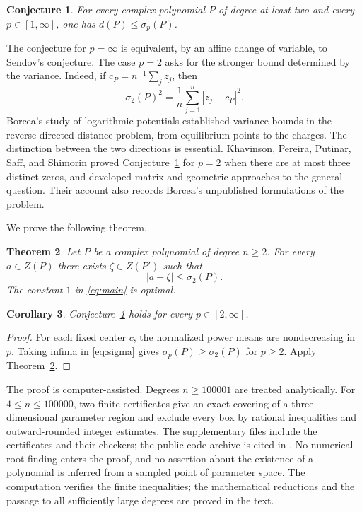 \documentclass[11pt,reqno]{amsart}
\newtheorem{thm}{Theorem}[section]
\newtheorem{cor}[thm]{Corollary}
\newtheorem{conjecture}[thm]{Conjecture}
\theoremstyle{definition}
\theoremstyle{remark}
\numberwithin{equation}{section}
\begin{document}
\begin{conjecture}\label{conj:borcea}
For every complex polynomial $P$ of degree at least two and every $p\in[1,\infty]$, one has $d(P)\le\sigma_p(P)$.
\end{conjecture}

The conjecture for $p=\infty$ is equivalent, by an affine change of variable, to Sendov's conjecture. The case $p=2$ asks for the stronger bound determined by the variance. Indeed, if $c_P=n^{-1}\sum_jz_j$, then
\begin{equation}\label{eq:variance}
 \sigma_2(P)^2=\frac1n\sum_{j=1}^n|z_j-c_P|^2.
\end{equation}
Borcea's study of logarithmic potentials \cite[\S3.2, Theorems~4 and~5]{Bor07} established variance bounds in the reverse directed-distance problem, from equilibrium points to the charges. The distinction between the two directions is essential. Khavinson, Pereira, Putinar, Saff, and Shimorin \cite[Theorem~3.2]{KPPSS11} proved Conjecture~\ref{conj:borcea} for $p=2$ when there are at most three distinct zeros, and developed matrix and geometric approaches to the general question. Their account also records Borcea's unpublished formulations of the problem.

We prove the following theorem.

\begin{thm}\label{thm:main}
Let $P$ be a complex polynomial of degree $n\ge2$. For every $a\in Z(P)$ there exists $\zeta\in Z(P')$ such that
\begin{equation}\label{eq:main}
 |a-\zeta|\le\sigma_2(P).
\end{equation}
The constant $1$ in \eqref{eq:main} is optimal.
\end{thm}

\begin{cor}\label{cor:p}
Conjecture~\ref{conj:borcea} holds for every $p\in[2,\infty]$.
\end{cor}
\begin{proof}
For each fixed center $c$, the normalized power means are nondecreasing in $p$. Taking infima in \eqref{eq:sigma} gives $\sigma_p(P)\ge\sigma_2(P)$ for $p\ge2$. Apply Theorem~\ref{thm:main}.
\end{proof}

The proof is computer-assisted. Degrees $n\ge100001$ are treated analytically. For $4\le n\le100000$, two finite certificates give an exact covering of a three-dimensional parameter region and exclude every box by rational inequalities and outward-rounded integer estimates. The supplementary files include the certificates and their checkers; the public code archive is cited in \cite{Zha26S}. No numerical root-finding enters the proof, and no assertion about the existence of a polynomial is inferred from a sampled point of parameter space. The computation verifies the finite inequalities; the mathematical reductions and the passage to all sufficiently large degrees are proved in the text.
\end{document}
